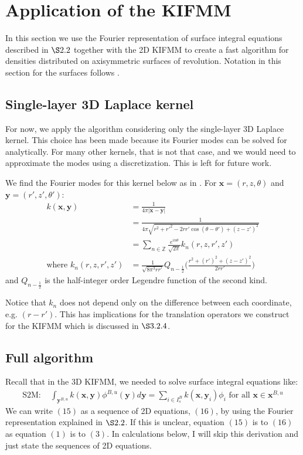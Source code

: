 \documentclass[12pt,letterpaper]{article}
\begin{document}
\section{Application of the KIFMM}
In this section we use the Fourier representation of surface integral equations described in $\S2.2$ together with the 2D KIFMM to create a fast algorithm for densities distributed on axisymmetric surfaces of revolution. Notation in this section for the surfaces follows \cite{YBZ}.

\subsection{Single-layer 3D Laplace kernel}
For now, we apply the algorithm considering only the single-layer 3D Laplace kernel. This choice has been made because its Fourier modes can be solved for analytically. For many other kernels, that is not that case, and we would need to approximate the modes using a discretization. This is left for future work.

We find the Fourier modes for this kernel below as in \cite{YYM}. For $\mathbf{x}=(r,z,\theta)$ and $\mathbf{y}=(r',z',\theta')$:
\begin{align}
k(\mathbf{x},\mathbf{y})&=\frac{1}{4\pi |\mathbf{x}-\mathbf{y}|}\\
&=\frac{1}{4\pi\sqrt{r^2+r'^2-2rr'\cos{(\theta-\theta')}+(z-z')^2}}\\
&=\sum_{n\in\mathbb{Z}}\frac{e^{in\theta}}{\sqrt{2\pi}}k_n(r,z,r',z')\\
\mbox{where }k_n(r,z,r',z')&=\frac{1}{\sqrt{8\pi^3rr'}}Q_{n-\frac{1}{2}}\bigg(\frac{r^2+(r')^2+(z-z')^2}{2rr'}\bigg)
\end{align}
and $Q_{n-\frac{1}{2}}$ is the half-integer order Legendre function of the second kind.

Notice that $k_n$ does not depend only on the difference between each coordinate, e.g. $(r-r')$. This has implications for the translation operators we construct for the KIFMM which is discussed in $\S3.2.4$.

\subsection{Full algorithm}
Recall that in the 3D KIFMM, we needed to solve surface integral equations like:
\begin{align}
\mbox{S2M: }&\int_{\mathbf{y}^{B,u}}{k(\mathbf{x},\mathbf{y})}\phi^{B,u}{(\mathbf{y})}d\mathbf{y}=\sum\limits_{i\in I_s^B} k(\mathbf{x},\mathbf{y}_i)\phi_i\mbox{ for all }\mathbf{x}\in\mathbf{x}^{B,u}
\end{align}
We can write $(15)$ as a sequence of 2D equations, $(16)$, by using the Fourier representation explained in $\S2.2$. If this is unclear, equation $(15)$ is to $(16)$ as equation $(1)$ is to $(3)$. In calculations below, I will skip this derivation and just state the sequences of 2D equations.
\end{document}
